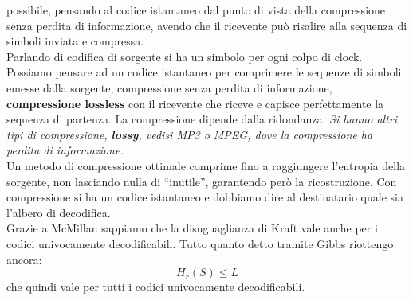 \documentclass[a4paper,12pt, oneside]{book}
\begin{document}
possibile, pensando al codice istantaneo dal punto di vista della compressione
senza perdita di informazione, avendo che il ricevente può risalire alla
sequenza di simboli inviata e compressa.\\
Parlando di codifica di sorgente si ha un simbolo per ogni colpo di
clock. Possiamo pensare ad un codice istantaneo per comprimere le sequenze di
simboli emesse dalla sorgente, compressione senza perdita di informazione,
\textbf{compressione lossless} con il
ricevente che riceve e capisce perfettamente la sequenza di partenza. La
compressione dipende dalla ridondanza.
\textit{Si hanno altri tipi di compressione, \textbf{lossy}, vedisi MP3 o MPEG,
  dove la compressione ha perdita di informazione.}\\
Un metodo di compressione ottimale comprime fino a raggiungere l'entropia della
sorgente, non lasciando nulla di ``inutile'', garantendo però la
ricostruzione. Con compressione si ha un codice istantaneo e dobbiamo dire al
destinatario quale sia l'albero di decodifica. \\
Grazie a McMillan sappiamo che la disuguaglianza di Kraft vale anche per i
codici univocamente decodificabili. Tutto quanto detto tramite Gibbs riottengo
ancora:
\[H_r(S)\leq L\]
che quindi vale per tutti i codici univocamente decodificabili.\\
\end{document}
